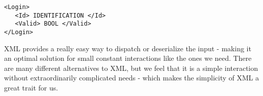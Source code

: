 \begin{lstlisting}
<Login>
   <Id> IDENTIFICATION </Id>
   <Valid> BOOL </Valid>
</Login>
\end{lstlisting}

XML provides a really easy way to dispatch or deserialize the input - making it an optimal solution for small constant interactions like the ones we need. There are many different alternatives to XML, but we feel that it is a simple interaction without extraordinarily complicated needs - which makes the simplicity of XML a great trait for us.





